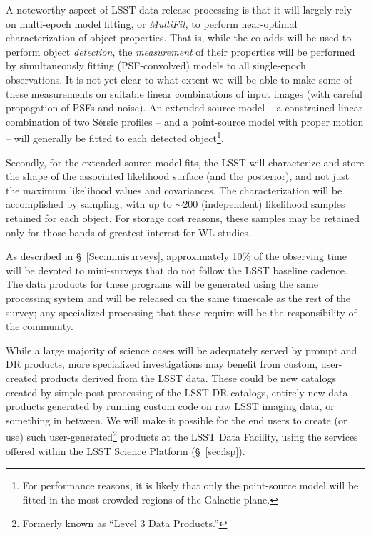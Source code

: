 \begin{enumerate}
A noteworthy aspect of LSST data release processing is that it will largely
rely on multi-epoch model fitting, or \textit{MultiFit}, to
perform near-optimal characterization of object properties. That is,
while the co-adds will be used to perform object \emph{detection}, the
\emph{measurement} of their properties will be performed by
simultaneously fitting (PSF-convolved) models to all single-epoch
observations. It is not yet clear to what extent we will be able to make some of these
measurements on suitable linear combinations of input images (with careful propagation
of PSFs and noise).
An extended source model -- a constrained linear
combination of two S\'ersic profiles -- and a point-source model with
proper motion -- will generally be
fitted to each detected object\footnote{For performance reasons, it is
  likely that only the point-source model will be fitted in the most
  crowded regions of the Galactic plane.}.

Secondly, for the extended source model fits, the LSST will
characterize and store the shape of the associated likelihood surface
(and the posterior), and not just the maximum likelihood values and
covariances. The characterization will be accomplished by sampling,
with up to $\sim$200 (independent) likelihood samples retained for
each object. For storage cost reasons, these samples
may be retained only for those bands of greatest interest for
WL studies.

\end{enumerate}

As described in \S~\ref{Sec:minisurveys}, approximately 10\% of the
observing time will be devoted to mini-surveys that do not follow the
LSST baseline cadence. The data products for these programs will be
generated using the same processing system and will be released on the
same timescale as the rest of the survey; any specialized processing
that these require will be the responsibility of the community.

While a large majority of science cases will be adequately served by prompt
and DR products, more specialized investigations may benefit from
custom, user-created products derived from the LSST data.  These could be
new catalogs created by simple post-processing of the LSST DR
catalogs, entirely new data products generated by running custom code on raw
LSST imaging data, or something in between.  We will make it possible for the
end users to create (or use) such user-generated\footnote{Formerly known as
``Level 3 Data Products.''} products at the LSST Data Facility,
using the services offered within the LSST Science Platform (\S~\ref{sec:lsp}).


